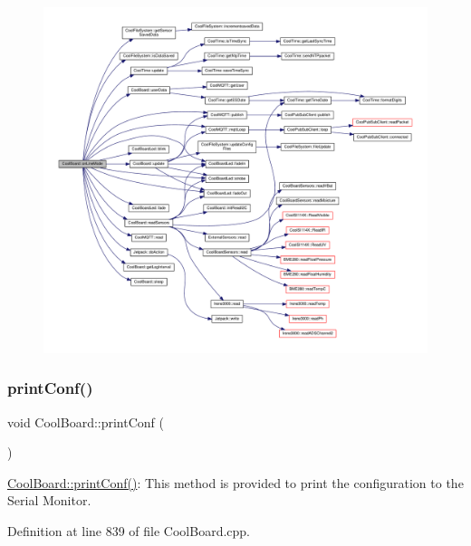 \begin{figure}[H]
\begin{center}
\leavevmode
\includegraphics[width=350pt]{d7/df9/class_cool_board_aa0bbc4bc605e35618d18e68795c61363_cgraph}
\end{center}
\end{figure}
\mbox{\label{class_cool_board_a486507b8f0981d3cc671ed31c2145755}} 
\subsubsection{\texorpdfstring{print\+Conf()}{printConf()}}
{\footnotesize\ttfamily void Cool\+Board\+::print\+Conf (\begin{DoxyParamCaption}{ }\end{DoxyParamCaption})}

\hyperlink{class_cool_board_a486507b8f0981d3cc671ed31c2145755}{Cool\+Board\+::print\+Conf()}\+: This method is provided to print the configuration to the Serial Monitor. 

Definition at line 839 of file Cool\+Board.\+cpp.


